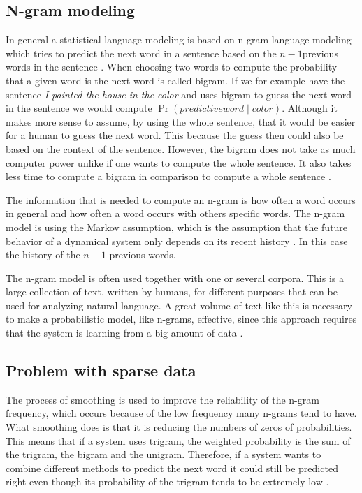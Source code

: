 \documentclass[a4paper,12pt]{article}
\begin{document}
\subsection{N-gram modeling}
In general a statistical language modeling is based on n-gram language modeling which tries to predict the next word in a sentence based on the $n-1$previous words in the sentence \cite{gallagher2004natural}.  When choosing two words to compute the probability that a given word is the next word is called bigram. If we for example have the sentence \emph{I painted the house in the color} and uses bigram to guess the next word in the sentence we would compute $\Pr(predictive word \mid color)$. Although it makes more sense to assume, by using the whole sentence, that it would be easier for a human to guess the next word. This because the guess then could also be based on the context of the sentence. However, the bigram does not take as much computer power unlike if one wants to compute the whole sentence. It also takes less time to compute a bigram in comparison to compute a whole sentence \cite{gallagher2004natural}.

The information that is needed to compute an n-gram is how often a word occurs in general and how often a word occurs with others specific words. The n-gram model is using the Markov assumption, which is the assumption that the future behavior of a dynamical system only depends on its recent history \cite{mooneynatural}. In this case the history of the $n-1$ previous words. 

The n-gram model is often used together with one or several corpora. This is a large collection of text, written by humans, for different purposes that can be used for analyzing natural language. A great volume of text like this is necessary to make a probabilistic model, like n-grams, effective, since this approach requires that the system is learning from a big amount of data \cite{russell2010ai}.

\subsection{Problem with sparse data}
The process of smoothing is used to improve the reliability of the n-gram frequency, which occurs because of the low frequency many n-grams tend to have. What smoothing does is that it is reducing the numbers of zeros of probabilities. This means that if a system uses trigram, the weighted probability is the sum of the trigram, the bigram and the unigram. Therefore, if a system wants to combine different methods to predict the next word it could still be predicted right even though its probability of the trigram tends to be extremely low \cite{smoothing}.
\end{document}
